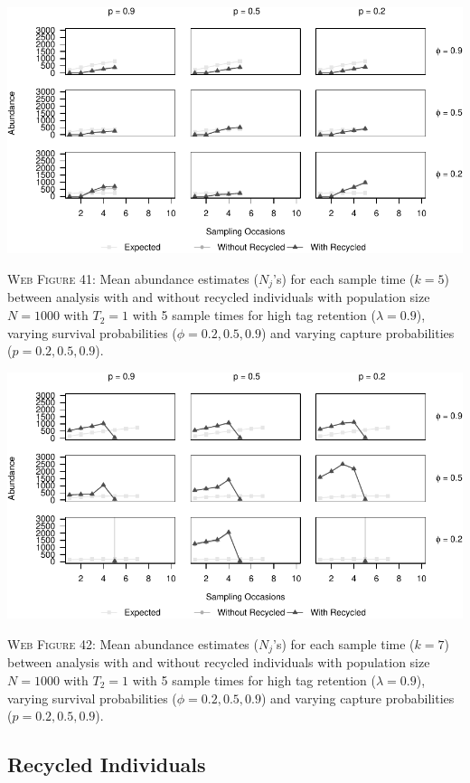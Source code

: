 \documentclass[]{article}
\begin{document}
\newpage

\includegraphics{Appendix_BW_files/figure-latex/41_abundance_H_GJSTL5-1.pdf}

\textsc{Web Figure 41:} Mean abundance estimates (\(N_j\)'s) for each
sample time (\(k=5\)) between analysis with and without recycled
individuals with population size \(N=1000\) with \(T_2=1\) with 5 sample times for high tag retention (\(\lambda=0.9\)), varying survival
probabilities (\(\phi=0.2,0.5,0.9\)) and varying capture probabilities
(\(p=0.2,0.5,0.9\)).

\includegraphics{Appendix_BW_files/figure-latex/42_abundance_H_GJSTL6-1.pdf}

\textsc{Web Figure 42:} Mean abundance estimates (\(N_j\)'s) for each
sample time (\(k=7\)) between analysis with and without recycled
individuals with population size \(N=1000\) with \(T_2=1\) with 5 sample times for high tag retention (\(\lambda=0.9\)), varying survival
probabilities (\(\phi=0.2,0.5,0.9\)) and varying capture probabilities
(\(p=0.2,0.5,0.9\)).

\newpage

\subsection{Recycled Individuals}\label{recycled-individuals}
\end{document}
